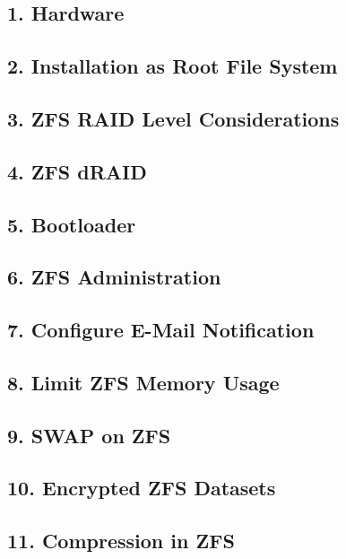 \subsection{1. Hardware}

\subsection{2. Installation as Root File System}

\subsection{3. ZFS RAID Level Considerations}

\subsection{4. ZFS dRAID}

\subsection{5. Bootloader}

\subsection{6. ZFS Administration}

\subsection{7. Configure E-Mail Notification}

\subsection{8. Limit ZFS Memory Usage}

\subsection{9. SWAP on ZFS}

\subsection{10. Encrypted ZFS Datasets}

\subsection{11. Compression in ZFS}

